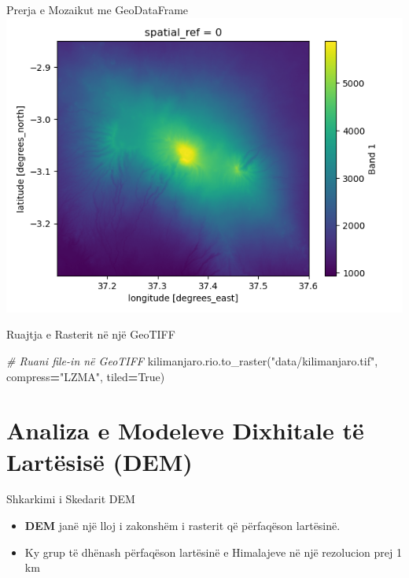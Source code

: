\documentclass[
  ignorenonframetext,
]{beamer}
\newenvironment{Shaded}{\begin{snugshade}}{\end{snugshade}}
\newcommand{\CommentTok}[1]{\textcolor[rgb]{0.56,0.35,0.01}{\textit{#1}}}
\newcommand{\NormalTok}[1]{#1}
\newcommand{\OperatorTok}[1]{\textcolor[rgb]{0.81,0.36,0.00}{\textbf{#1}}}
\newcommand{\StringTok}[1]{\textcolor[rgb]{0.31,0.60,0.02}{#1}}
\newcommand{\VariableTok}[1]{\textcolor[rgb]{0.00,0.00,0.00}{#1}}
\begin{document}
\begin{frame}{Prerja e Mozaikut me GeoDataFrame}
\protect\hypertarget{prerja-e-mozaikut-me-geodataframe-1}{}
\includegraphics{./Figs/mosaic3.png}
\end{frame}

\begin{frame}[fragile]{Ruajtja e Rasterit në një GeoTIFF}
\protect\hypertarget{ruajtja-e-rasterit-nuxeb-njuxeb-geotiff}{}

\begin{Shaded}
\begin{Highlighting}[]
\CommentTok{\# Ruani file{-}in në GeoTIFF}
\NormalTok{kilimanjaro.rio.to\_raster(}\StringTok{"data/kilimanjaro.tif"}\NormalTok{, compress}\OperatorTok{=}\StringTok{"LZMA"}\NormalTok{, tiled}\OperatorTok{=}\VariableTok{True}\NormalTok{)}
\end{Highlighting}
\end{Shaded}
\end{frame}

\hypertarget{analiza-e-modeleve-dixhitale-tuxeb-lartuxebsisuxeb-dem}{%
\section{Analiza e Modeleve Dixhitale të Lartësisë
(DEM)}\label{analiza-e-modeleve-dixhitale-tuxeb-lartuxebsisuxeb-dem}}

\begin{frame}{Shkarkimi i Skedarit DEM}
\protect\hypertarget{shkarkimi-i-skedarit-dem}{}
\begin{itemize}
\item
  \textbf{DEM} janë një lloj i zakonshëm i rasterit që përfaqëson
  lartësinë.
\item
  Ky grup të dhënash përfaqëson lartësinë e Himalajeve në një rezolucion
  prej 1 km
\end{itemize}
\end{frame}
\end{document}
